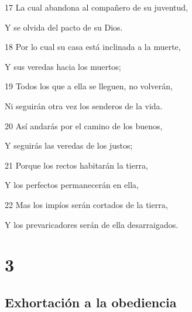 \par 17 La cual abandona al compañero de su juventud,
\par Y se olvida del pacto de su Dios.
\par 18 Por lo cual su casa está inclinada a la muerte,
\par Y sus veredas hacia los muertos;
\par 19 Todos los que a ella se lleguen, no volverán,
\par Ni seguirán otra vez los senderos de la vida.
\par 20 Así andarás por el camino de los buenos,
\par Y seguirás las veredas de los justos;
\par 21 Porque los rectos habitarán la tierra,
\par Y los perfectos permanecerán en ella,
\par 22 Mas los impíos serán cortados de la tierra,
\par Y los prevaricadores serán de ella desarraigados.

\chapter{3}

\section*{Exhortación a la obediencia}

